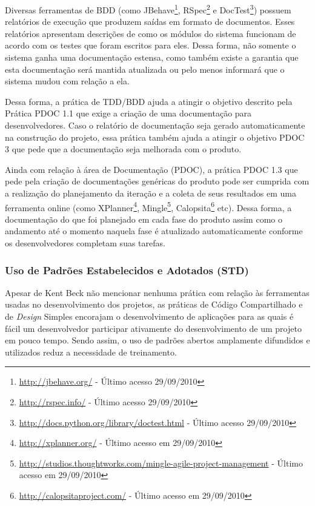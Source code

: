 Diversas ferramentas de BDD (como
JBehave\footnote{\url{http://jbehave.org/} - Último acesso
  29/09/2010}, RSpec\footnote{\url{http://rspec.info/} - Último acesso
  29/09/2010} e
DocTest\footnote{\url{http://docs.python.org/library/doctest.html} -
  Último acesso 29/09/2010}) possuem relatórios de execução que
produzem saídas em formato de documentos. Esses relatórios apresentam
descrições de como os módulos do sistema funcionam de acordo com os
testes que foram escritos para eles. Dessa forma, não somente o
sistema ganha uma documentação estensa, como também existe a garantia
que esta documentação será mantida atualizada ou pelo menos informará
que o sistema mudou com relação a ela.

Dessa forma, a prática de TDD/BDD ajuda a atingir o objetivo descrito
pela Prática PDOC 1.1 que exige a criação de uma documentação para
desenvolvedores. Caso o relatório de documentação seja gerado
automaticamente na construção do projeto, essa prática também ajuda a
atingir o objetivo PDOC 3 que pede que a documentação seja melhorada
com o produto.

Ainda com relação à área de Documentação (PDOC), a prática PDOC 1.3
que pede pela criação de documentações genéricas do produto pode ser
cumprida com a realização do planejamento da iteração e a coleta de
seus resultados em uma ferramenta online (como
XPlanner\footnote{\url{http://xplanner.org/} - Último acesso em
  29/09/2010},
Mingle\footnote{\url{http://studios.thoughtworks.com/mingle-agile-project-management}
  - Último acesso em 29/09/2010},
Calopsita\footnote{\url{http://calopsitaproject.com/} - Último acesso
  em 29/09/2010} etc). Dessa forma, a documentação do que foi
planejado em cada fase do produto assim como o andamento até o momento
naquela fase é atualizado automaticamente conforme os desenvolvedores
completam suas tarefas.

\subsubsection{Uso de Padrões Estabelecidos e Adotados (STD)}
\label{sec:+std}

Apesar de Kent Beck não mencionar nenhuma prática com relação às
ferramentas usadas no desenvolvimento dos projetos, as práticas de
Código Compartilhado e de \textit{Design} Simples encorajam o
desenvolvimento de aplicações para as quais é fácil um desenvolvedor
participar ativamente do desenvolvimento de um projeto em pouco
tempo. Sendo assim, o uso de padrões abertos amplamente difundidos e
utilizados reduz a necessidade de treinamento.

